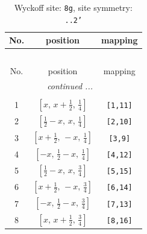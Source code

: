 \documentclass[fleqn,8pt]{jsarticle}
\begin{document}
\renewcommand{\arraystretch}{1.2}
\begin{longtable}{ccc}
\caption{Wyckoff site: {\tt 8g}, site symmetry: {\tt ..2'}}
 \\
 \hline \hline
No. & position & mapping \\ \hline \endfirsthead

\multicolumn{2}{l}{\tablename\ \thetable{}} \\
 \hline \hline
No. & position & mapping \\ \hline \endhead

 \hline \hline
\multicolumn{2}{r}{\footnotesize\it continued ...} \\ \endfoot

 \hline \hline
\multicolumn{2}{r}{} \\ \endlastfoot

1 & $\left[ x,\, x + \frac{1}{2},\, \frac{1}{4} \right]$ & {\tt [1,11]} \\ \hline
2 & $\left[ \frac{1}{2} - x,\, x,\, \frac{1}{4} \right]$ & {\tt [2,10]} \\ \hline
3 & $\left[ x + \frac{1}{2},\, - x,\, \frac{1}{4} \right]$ & {\tt [3,9]} \\ \hline
4 & $\left[ - x,\, \frac{1}{2} - x,\, \frac{1}{4} \right]$ & {\tt [4,12]} \\ \hline
5 & $\left[ \frac{1}{2} - x,\, x,\, \frac{3}{4} \right]$ & {\tt [5,15]} \\ \hline
6 & $\left[ x + \frac{1}{2},\, - x,\, \frac{3}{4} \right]$ & {\tt [6,14]} \\ \hline
7 & $\left[ - x,\, \frac{1}{2} - x,\, \frac{3}{4} \right]$ & {\tt [7,13]} \\ \hline
8 & $\left[ x,\, x + \frac{1}{2},\, \frac{3}{4} \right]$ & {\tt [8,16]} \\
\end{longtable}
\renewcommand{\arraystretch}{1.2}
\end{document}
